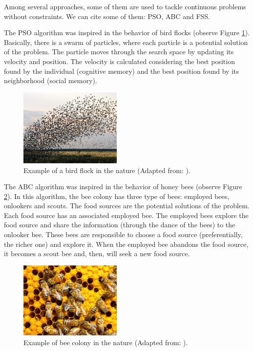 Among several approaches, some of them are used to tackle continuous problems without
constraints. We can cite some of them: PSO, ABC and FSS.

The PSO algorithm was inspired in the behavior of bird flocks (observe Figure
\ref{fig:flock_birds}). Basically, there is a swarm of particles, where
each particle is a potential solution of the problem. The particle moves through the search space by updating its velocity and position. The velocity is calculated
considering the best position found by the individual (cognitive memory) and the
best position found by its neighborhood (social memory).
\begin{figure}[!h]
\centering
 \includegraphics[width=0.45\textwidth]{image/flock_of_birds.jpg}
 \caption{\small{Example of a bird flock in the nature (Adapted from:
\cite{SI:Bird2012}).}}
 \label{fig:flock_birds}
\end{figure}

The ABC algorithm was inspired in the behavior of honey bees (observe Figure
\ref{fig:bee_colony}). In this algorithm, the bee colony has three type of bees:
employed bees, onlookers and scouts. The food sources are the potential solutions of
the problem. Each food source has an associated employed bee. The
employed bees explore the food source and share the information (through the
dance of the bees) to the onlooker bee. These bees are responsible to choose a
food source (preferentially, the richer one) and explore it. When the employed
bee abandons the food source, it becomes a scout bee and, then, will seek a
new food source.
\begin{figure}[!h]
\centering
 \includegraphics[width=0.45\textwidth]{image/bee_colony.png}
 \caption{\small{Example of bee colony in the nature (Adapted from: \cite{SI:Bee2012}).}}
 \label{fig:bee_colony}
\end{figure}

